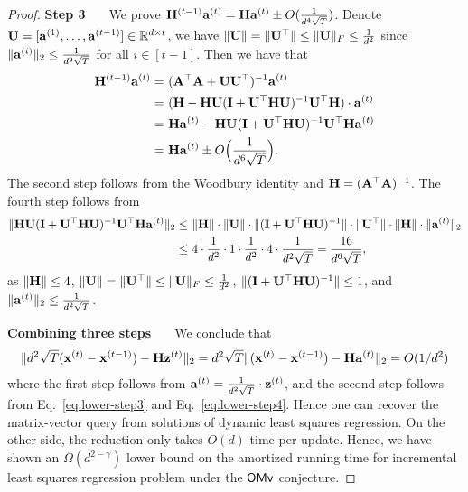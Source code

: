 \begin{proof}
{\noindent \bf Step 3 \ \ } We prove $\mathbf{H}^{(t-1)} \mathbf{a}^{(t)} = \mathbf{H} \mathbf{a}^{(t)} \pm O(\frac{1}{d^4\sqrt{T}})$. Denote $\mathbf{U} = [\mathbf{a}^{(1)}, \ldots, \mathbf{a}^{(t-1)}] \in \mathbb{R}^{d\times t}$, we have $\|\mathbf{U}\| = \|\mathbf{U}^{\top}\| \leq \|\mathbf{U}\|_{F} \leq \frac{1}{d^2}$ since $\|\mathbf{a}^{(i)}\|_2 \leq \frac{1}{d^2 \sqrt{T}}$ for all $i \in [t-1]$. Then we have that 
\begin{align}
 \mathbf{H}^{(t-1)} \mathbf{a}^{(t)} 
= &~ (\mathbf{A}^{\top}\mathbf{A} + \mathbf{U} \mathbf{U}^{\top})^{-1}\mathbf{a}^{(t)} \notag\\
= &~ (\mathbf{H} - \mathbf{H} \mathbf{U}(\mathbf{I} + \mathbf{U}^{\top}\mathbf{H} \mathbf{U})^{-1}\mathbf{U}^{\top}\mathbf{H}) \cdot \mathbf{a}^{(t)} \notag\\
= &~ \mathbf{H} \mathbf{a}^{(t)} - \mathbf{H} \mathbf{U}(\mathbf{I} + \mathbf{U}^{\top}\mathbf{H} \mathbf{U})^{-1}\mathbf{U}^{\top}\mathbf{H} \mathbf{a}^{(t)} \notag\\
= &~ \mathbf{H} \mathbf{a}^{(t)} \pm O\Big(\frac{1}{d^6\sqrt{T}}\Big) .\label{eq:lower-step4}
\end{align}
The second step follows from the Woodbury identity and $\mathbf{H} = (\mathbf{A}^{\top}\mathbf{A})^{-1}$.
The fourth step follows from
\begin{align*}
\| \mathbf{H} \mathbf{U}(\mathbf{I} + \mathbf{U}^{\top}\mathbf{H} \mathbf{U})^{-1}\mathbf{U}^{\top}\mathbf{H} \mathbf{a}^{(t)} \|_2 \leq &~ \|\mathbf{H}\| \cdot \|\mathbf{U}\| \cdot \|(\mathbf{I} + \mathbf{U}^{\top}\mathbf{H} \mathbf{U})^{-1}\| \cdot \|\mathbf{U}^{\top}\| \cdot \|\mathbf{H}\| \cdot \|\mathbf{a}^{(t)}\|_2\\
\leq &~ 4 \cdot \frac{1}{d^2} \cdot 1 \cdot\frac{1}{d^2}\cdot 4\cdot \frac{1}{d^2\sqrt{T}} = \frac{16}{d^6\sqrt{T}},
\end{align*}
as $\|\mathbf{H}\| \leq 4$, $\|\mathbf{U}\| = \|\mathbf{U}^{\top}\| \leq \|\mathbf{U}\|_{F} \leq \frac{1}{d^2}$, $\|(\mathbf{I} + \mathbf{U}^{\top}\mathbf{H} \mathbf{U})^{-1}\| \leq 1$, and $\|\mathbf{a}^{(t)}\|_2 \leq \frac{1}{d^2 \sqrt{T}}$.

\vspace{+2mm}
{\noindent \bf Combining three steps \ \ } We conclude that
\begin{align*}
    \|d^2\sqrt{T}(\mathbf{x}^{(t)} - \mathbf{x}^{(t-1)}) - \mathbf{H} \mathbf{z}^{(t)}\|_2 = d^2\sqrt{T} \|(\mathbf{x}^{(t)} - \mathbf{x}^{(t-1)}) - \mathbf{H} \mathbf{a}^{(t)}\|_2 = O(1/d^2)
\end{align*}
where the first step follows from $\mathbf{a}^{(t)} = \frac{1}{d^2\sqrt{T}}\cdot \mathbf{z}^{(t)}$, and the second step follows from Eq.~\eqref{eq:lower-step3} and Eq.~\eqref{eq:lower-step4}.
Hence one can recover the matrix-vector query from solutions of dynamic least squares regression. 
On the other side, the reduction only takes $O(d)$ time per update.
Hence, we have shown an $\Omega(d^{2-\gamma})$ lower bound on the amortized running time for incremental least squares regression problem under the $\mathsf{OMv}$ conjecture.
\end{proof}





















